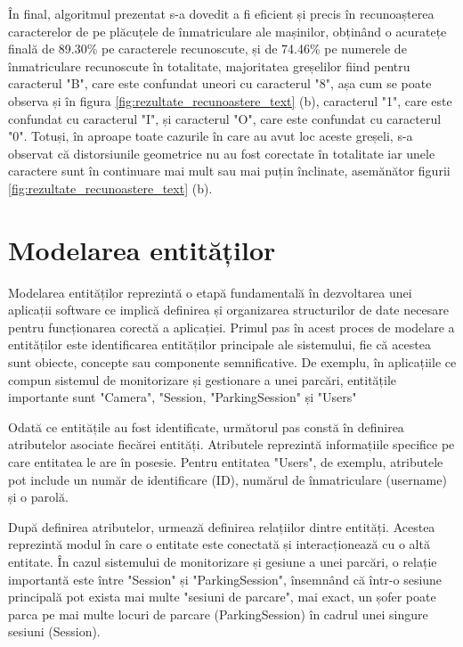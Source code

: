 \documentclass[12pt]{article}
\begin{document}
\^{I}n final, algoritmul prezentat s-a dovedit a fi eficient și precis \^{i}n recunoașterea caracterelor de pe pl\u{a}cuțele de \^{i}nmatriculare ale mașinilor, obțin\^{a}nd o acuratețe final\u{a} de 89.30\% pe caracterele recunoscute, și de 74.46\% pe numerele de \^{i}nmatriculare recunoscute \^{i}n totalitate, majoritatea greșelilor fiind pentru caracterul "B", care este confundat uneori cu caracterul "8", așa cum se poate observa și \^{i}n figura \ref{fig:rezultate_recunoastere_text} (b), caracterul "1", care este confundat cu caracterul "I", și caracterul "O", care este confundat cu caracterul "0". Totuși, \^{i}n aproape toate cazurile \^{i}n care au avut loc aceste greșeli, s-a observat c\u{a} distorsiunile geometrice nu au fost corectate \^{i}n totalitate iar unele caractere sunt \^{i}n continuare mai mult sau mai puțin \^{i}nclinate, asem\u{a}n\u{a}tor figurii \ref{fig:rezultate_recunoastere_text} (b).

\newpage

\section{Modelarea entităților}

Modelarea entit\u{a}ților reprezint\u{a} o etap\u{a} fundamental\u{a} \^{i}n dezvoltarea unei aplicații software ce implic\u{a} definirea și organizarea structurilor de date necesare pentru funcționarea corect\u{a} a aplicației. Primul pas \^{i}n acest proces de modelare a entit\u{a}ților este identificarea entit\u{a}ților principale ale sistemului, fie c\u{a} acestea sunt obiecte, concepte sau componente semnificative. De exemplu, \^{i}n aplicațiile ce compun sistemul de monitorizare și gestionare a unei parc\u{a}ri, entit\u{a}țile importante sunt "Camera", "Session, "ParkingSession" și "Users" 

Odat\u{a} ce entit\u{a}țile au fost identificate, urm\u{a}torul pas const\u{a} \^{i}n definirea atributelor asociate fiec\u{a}rei entit\u{a}ți. Atributele reprezint\u{a} informațiile specifice pe care entitatea le are \^{i}n posesie. Pentru entitatea "Users", de exemplu, atributele pot include un num\u{a}r de identificare (ID), num\u{a}rul de \^{i}nmatriculare (username) și o parol\u{a}.

Dup\u{a} definirea atributelor, urmeaz\u{a} definirea relațiilor dintre entit\u{a}ți. Acestea reprezint\u{a} modul \^{i}n care o entitate este conectat\u{a} și interacționeaz\u{a} cu o alt\u{a} entitate. \^{I}n cazul sistemului de monitorizare și gesiune a unei parc\u{a}ri, o relație important\u{a} este \^{i}ntre "Session" și "ParkingSession", \^{i}nsemn\^{a}nd c\u{a} \^{i}ntr-o sesiune principal\u{a} pot exista mai multe "sesiuni de parcare", mai exact, un șofer poate parca pe mai multe locuri de parcare (ParkingSession) \^{i}n cadrul unei singure sesiuni (Session).
\end{document}
